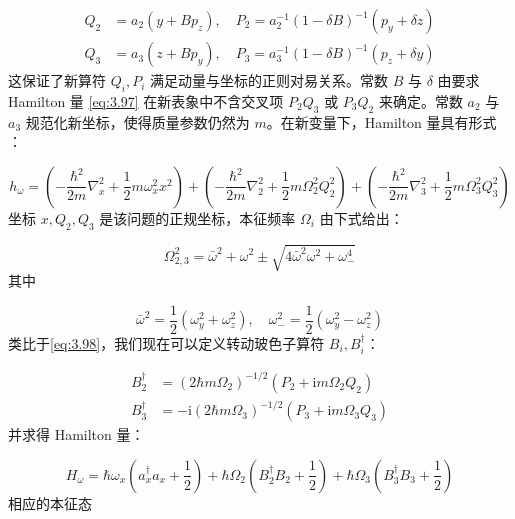 \begin{align}
Q_{2} & =a_{2}(y+Bp_{z}),\quad P_{2}=a^{-1}_{2}(1-\delta B)^{-1}(p_{y}+\delta z)\nonumber \\
Q_{3} & =a_{3}(z+Bp_{y}),\quad P_{3}=a^{-1}_{3}(1-\delta B)^{-1}(p_{z}+\delta y)\label{eq:3.108}
\end{align}
这保证了新算符 $Q_{i},P_{i}$ 满足动量与坐标的正则对易关系。常数 $B$ 与 $\delta$ 由要求 Hamilton
量 \ref{eq:3.97} 在新表象中不含交叉项 $P_{2}Q_{3}$ 或 $P_{3}Q_{2}$ 来确定。常数 $a_{2}$
与 $a_{3}$ 规范化新坐标，使得质量参数仍然为 $m$。在新变量下，Hamilton 量具有形式 \cite{Va56}：

\begin{equation}
h_{\omega}=\left(-\frac{\hbar^{2}}{2m}\nabla^{2}_{x}+\frac{1}{2}m\omega^{2}_{x}x^{2}\right)+\left(-\frac{\hbar^{2}}{2m}\nabla^{2}_{2}+\frac{1}{2}m\Omega^{2}_{2}Q^{2}_{2}\right)+\left(-\frac{\hbar^{2}}{2m}\nabla^{2}_{3}+\frac{1}{2}m\Omega^{2}_{3}Q^{2}_{3}\right)\label{eq:3.109}
\end{equation}
坐标 $x,Q_{2},Q_{3}$ 是该问题的正规坐标，本征频率 $\Omega_{i}$ 由下式给出：

\begin{equation}
\Omega^{2}_{2,3}=\bar{\omega}^{2}+\omega^{2}\pm\sqrt{4\bar{\omega}^{2}\omega^{2}+\omega^{4}_{-}}\label{eq:3.110}
\end{equation}
其中

\begin{equation}
\bar{\omega}^{2}=\frac{1}{2}\left(\omega^{2}_{y}+\omega^{2}_{z}\right),\quad\omega^{2}_{-}=\frac{1}{2}\left(\omega^{2}_{y}-\omega^{2}_{z}\right)\label{eq:3.111}
\end{equation}
类比于\ref{eq:3.98}，我们现在可以定义转动玻色子算符 $B_{i},B^{\dagger}_{i}$：

\begin{align}
B^{\dagger}_{2} & =(2\hbar m\Omega_{2})^{-1/2}(P_{2}+\mathrm{i}m\Omega_{2}Q_{2})\nonumber \\
B^{\dagger}_{3} & =-\mathrm{i}(2\hbar m\Omega_{3})^{-1/2}(P_{3}+\mathrm{i}m\Omega_{3}Q_{3})\label{eq:3.112}
\end{align}
并求得 Hamilton 量：

\begin{equation}
H_{\omega}=\hbar\omega_{x}\left(a^{\dagger}_{x}a_{x}+\frac{1}{2}\right)+\hbar\Omega_{2}\left(B^{\dagger}_{2}B_{2}+\frac{1}{2}\right)+\hbar\Omega_{3}\left(B^{\dagger}_{3}B_{3}+\frac{1}{2}\right)\label{eq:3.113}
\end{equation}
相应的本征态

